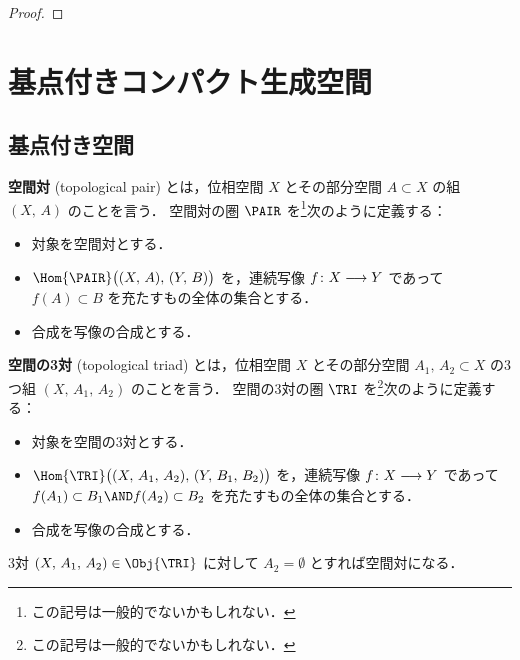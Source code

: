 \documentclass[algtopo_main]{subfiles}
\begin{document}
\begin{proof}
        
        
\end{proof}

\section{基点付きコンパクト生成空間}

\subsection{基点付き空間}

\textbf{空間対} (topological pair) とは，位相空間 $X$ とその部分空間 $A \subset X$ の組 $(X,\, A)$ のことを言う．
空間対の圏 $\PAIR$ を\footnote{この記号は一般的でないかもしれない．}次のように定義する：
\begin{itemize}
    \item 対象を空間対とする．
    \item $\Hom{\PAIR}\bigl((X,\, A),\, (Y,\, B)\bigr)$ を，連続写像 $f \colon X \longrightarrow Y$ であって $f(A) \subset B$ を充たすもの全体の集合とする．
    \item 合成を写像の合成とする．
\end{itemize}

\textbf{空間の3対} (topological triad) とは，位相空間 $X$ とその部分空間 $A_1,\, A_2 \subset X$ の3つ組 $(X,\, A_1,\, A_2)$ のことを言う．
空間の3対の圏 $\TRI$ を\footnote{この記号は一般的でないかもしれない．}次のように定義する：
\begin{itemize}
    \item 対象を空間の3対とする．
    \item $\Hom{\TRI}\bigl((X,\, A_1,\, A_2),\, (Y,\, B_1,\, B_2)\bigr)$ を，連続写像 $f \colon X \longrightarrow Y$ であって $f(A_1) \subset B_1 \AND f(A_2) \subset B_2$ を充たすもの全体の集合とする．
    \item 合成を写像の合成とする．
\end{itemize}
3対 $(X,\, A_1,\, A_2) \in \Obj{\TRI}$ に対して $A_2 = \emptyset$ とすれば空間対になる．
\end{document}
